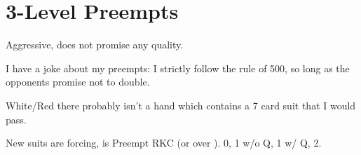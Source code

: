 \documentclass[tom-ari]{subfile}
\begin{document}
	
	\chapter{3-Level Preempts}
	
	Aggressive, does not promise any quality. 
	
	I have a joke about my preempts: I strictly follow the rule of 500, so long as the opponents promise not to double.
	
	White/Red there probably isn't a hand which contains a 7 card suit that I would pass.
	
	New suits are forcing,  is Preempt RKC (or  over ). 0, 1 w/o Q, 1 w/ Q, 2.
	
\end{document}

